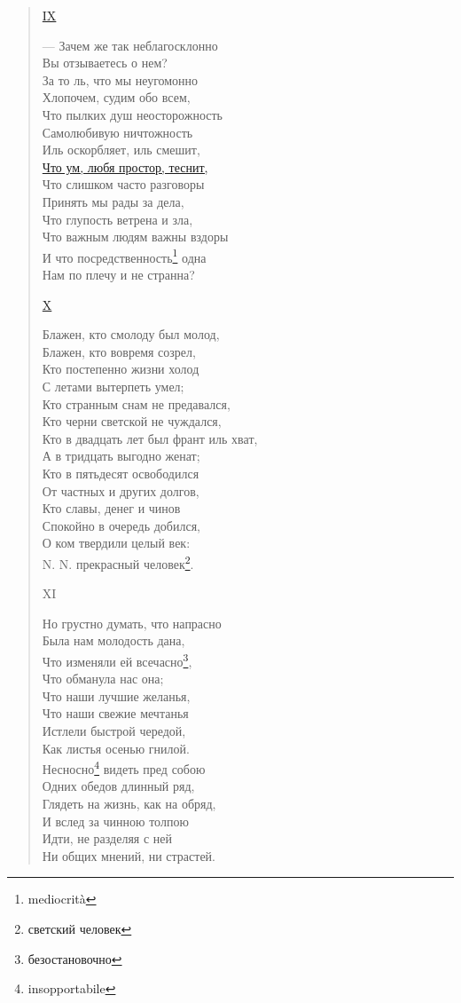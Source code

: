 \begin{verse}
\hyperref[giudizio]{IX}

— Зачем же так неблагосклонно\\
Вы отзываетесь о нем?\\
За то ль, что мы неугомонно\\
Хлопочем, судим обо всем,\\
Что пылких душ неосторожность\\
Самолюбивую ничтожность\\
Иль оскорбляет, иль смешит,\\
\hyperref[intelligenza]{Что ум, любя простор, теснит,}\\
Что слишком часто разговоры\\
Принять мы рады за дела,\\
Что глупость ветрена и зла,\\
Что важным людям важны вздоры\\
И что посредственность\footnote{mediocrità} одна\\
Нам по плечу и не странна?

\hyperref[felicita]{X}

Блажен, кто смолоду был молод,\\
Блажен, кто вовремя созрел,\\
Кто постепенно жизни холод\\
С летами вытерпеть умел;\\
Кто странным снам не предавался,\\
Кто черни светской не чуждался,\\
Кто в двадцать лет был франт иль хват,\\
А в тридцать выгодно женат;\\
Кто в пятьдесят освободился\\
От частных и других долгов,\\
Кто славы, денег и чинов\\
Спокойно в очередь добился,\\
О ком твердили целый век:\\
N. N. прекрасный человек\footnote{светский человек}.

XI

Но грустно думать, что напрасно\\
Была нам молодость дана,\\
Что изменяли ей всечасно\footnote{безостановочно},\\
Что обманула нас она;\\
Что наши лучшие желанья,\\
Что наши свежие мечтанья\\
Истлели быстрой чередой,\\
Как листья осенью гнилой.\\
Несносно\footnote{insopportabile} видеть пред собою\\
Одних обедов длинный ряд,\\
Глядеть на жизнь, как на обряд,\\
И вслед за чинною толпою\\
Идти, не разделяя с ней\\
Ни общих мнений, ни страстей.


\end{verse}
